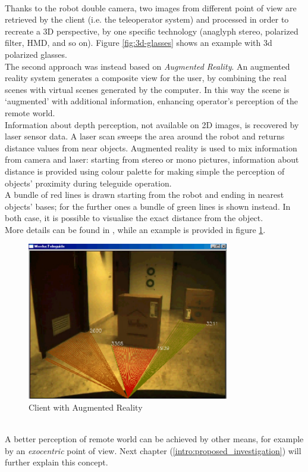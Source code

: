 \\
Thanks to the robot double camera, two images from different point of
view are retrieved by the client (i.e. the teleoperator system) and
processed in order to recreate a 3D perspective, by one specific
technology (anaglyph stereo, polarized filter, HMD, and so on).
Figure \ref{fig:3d-glasses} shows an example with 3d polarized
glasses.
\\
The second approach was instead based on \textit{Augmented Reality}.
An augmented reality system generates a composite view for the user,
by combining the real scenes with virtual scenes generated by the
computer. In this way the scene is `augmented' with additional
information, enhancing operator's perception of the remote world.
\\
Information about depth perception, not available on
2D images, is recovered by laser sensor data. A laser scan sweeps the area
around the robot and returns distance values from near objects. Augmented
reality is used to mix information from camera and laser: starting from
stereo or mono pictures, information about distance is provided using colour
palette for making simple the perception of objects' proximity during
teleguide operation.
\\
A bundle of red lines is drawn starting from the robot
and ending in nearest objects' bases; for the further ones a bundle of green
lines is shown instead. In both case, it is possible to visualise the
exact distance from the object.
\\
More details can be found in \cite{morduc:macalusodetommaso}, while an
example is provided in figure \ref{fig:augmented_morduc}.
\begin{figure} [h]
  \begin{center}
    \includegraphics[width=250pt]{img/augmented_morduc.png}
    \caption{Client with Augmented Reality}
    \label{fig:augmented_morduc}
  \end{center}
\end{figure}
\\
A better perception of remote world can be achieved by other means,
for example by an \textit{exocentric} point of view. Next chapter
(\ref{intro:proposed_investigation}) will further explain this concept.
